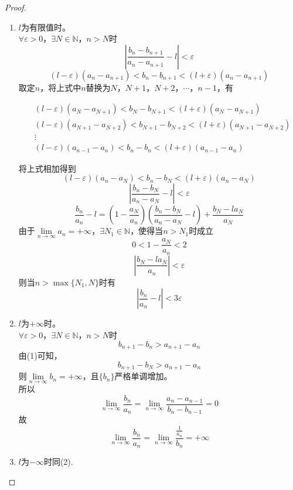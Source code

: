 \begin{proof}

    \begin{enumerate}

        \item
            $l$为有限值时。\\
            $\forall \varepsilon>0$，$\exists N \in \mathbb{N}$，$n > N$时
            $$\left| \dfrac{b_n - b_{n + 1}}{a_n - a_{n + 1}} - l \right| < \varepsilon$$
            $$(l - \varepsilon)(a_n - a_{n + 1}) < b_n - b_{n + 1} < (l + \varepsilon)(a_n - a_{n + 1})$$
            取定$n$，将上式中$n$替换为$N$，$N + 1$，$N + 2$，$\cdots$，$n - 1$，有

            \begin{align*}
                & (l - \varepsilon)(a_{N} - a_{N + 1})<b_{N} - b_{N + 1} < (l + \varepsilon)(a_{N} - a_{N + 1}) \\
                & (l - \varepsilon)(a_{N + 1} - a_{N + 2}) < b_{N + 1} - b_{N + 2} < (l + \varepsilon)(a_{N + 1} - a_{N + 2}) \\
                & \vdots \\
                & (l - \varepsilon)(a_{n - 1} - a_{n}) < b_{n} - b_{n} < (l + \varepsilon)(a_{n - 1} - a_{n})
            \end{align*}

            将上式相加得到
            $$(l - \varepsilon)(a_{n} - a_{N}) < b_{n} - b_{N} < (l + \varepsilon)(a_{n} - a_{N})$$
            $$\left| \dfrac{b_n - b_{N}}{a_n - a_{N}} - l \right| < \varepsilon$$
            $$\dfrac{b_n}{a_n} - l = \left( 1 - \dfrac{a_N}{a_n} \right)\left( \dfrac{b_n - b_N}{a_n - a_N} - l \right) + \dfrac{b_N - la_N}{a_N}$$
            由于$\lim\limits_{n \to \infty}{a_n} = +\infty$，$\exists N_1 \in \mathbb{N}$，使得当$n > N_1$时成立
            $$0 < 1 - \dfrac{a_N}{a_n} < 2$$
            $$\left| \dfrac{b_N - la_N}{a_n} \right| < \varepsilon$$
            则当$n>\max\{N_1, N\}$时有
            $$\left| \dfrac{b_n}{a_n} - l \right| < 3\varepsilon$$

        \item
            $l$为$+\infty$时。\\
            $\forall \varepsilon>0$，$\exists N \in \mathbb{N}$，$n > N$时
            $$b_{n + 1} - b_n > a_{n + 1} - a_n$$
            由\textup{(1)}可知，
            $$b_{n + 1} - b_N > a_{n + 1} - a_n$$
            则$\lim\limits_{n \to \infty}{b_n} = +\infty$，且$\{b_n\}$严格单调增加。\\
            所以
            $$\lim\limits_{n \to \infty}{\dfrac{b_n}{a_n}} = \lim\limits_{n \to \infty}{\dfrac{a_n - a_{n - 1}}{b_n - b_{n - 1}}} = 0$$
            故
            $$\lim\limits_{n \to \infty}{\dfrac{b_n}{a_n}} = \lim\limits_{n \to \infty}{\dfrac{\frac{1}{a_n}}{b_n}} = +\infty$$

        \item $l$为$-\infty$时同\textup{(2)}.

    \end{enumerate}

\end{proof}

